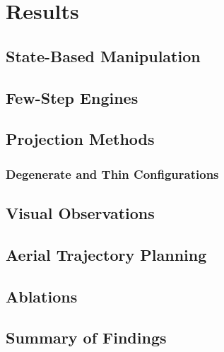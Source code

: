 \chapter{Results}\label{ch:results}
\section{State-Based Manipulation}\label{sec:res:state}
\section{Few-Step Engines}\label{sec:res:fewstep}
\section{Projection Methods}\label{sec:res:constraints}
\subsection{Degenerate and Thin Configurations}\label{sec:res:constraints:degenerate}
\section{Visual Observations}\label{sec:res:visual}
\section{Aerial Trajectory Planning}\label{sec:res:uav}
\section{Ablations}\label{sec:res:ablations}
\section{Summary of Findings}\label{sec:res:summary}


